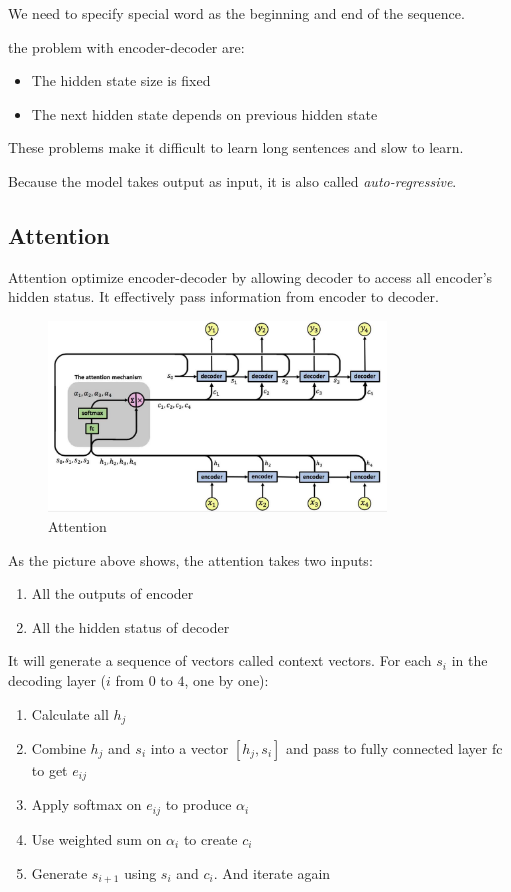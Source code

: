 We need to specify special word as the beginning and end of the sequence.

the problem with encoder-decoder are:
\begin{itemize}
    \item The hidden state size is fixed
    \item The next hidden state depends on previous hidden state
\end{itemize}
These problems make it difficult to learn long sentences and slow to learn.

Because the model takes output as input, it is also called \emph{auto-regressive}.

\subsection{Attention}

Attention optimize encoder-decoder by allowing decoder to access all encoder's hidden status. It effectively pass information from encoder to decoder.

\begin{figure}[H]
\includegraphics[width=0.8\textwidth]{machine_learning/pic/04/attention.jpeg}
\centering
\caption{Attention}
\end{figure}


As the picture above shows, the attention takes two inputs:
\begin{enumerate}
    \item All the outputs of encoder
    \item All the hidden status of decoder
\end{enumerate}

It will generate a sequence of vectors called context vectors. For each $s_i$ in the decoding layer ($i$ from $0$ to $4$, one by one):
\begin{enumerate}
    \item Calculate all $h_j$
    \item Combine $h_j$ and $s_i$ into a vector $[h_j, s_i]$ and pass to fully connected layer $\mathrm{fc}$ to get $e_{ij}$
    \item Apply softmax on $e_{ij}$ to produce $\alpha_i$
    \item Use weighted sum on $\alpha_i$ to create $c_i$
    \item Generate $s_{i+1}$ using $s_i$ and $c_i$. And iterate again
\end{enumerate}


